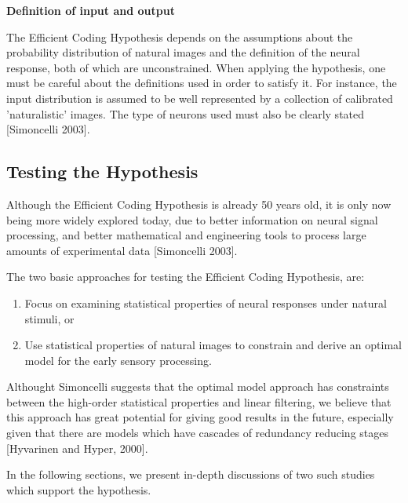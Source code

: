 \documentclass[twoside]{article}
\begin{document}
\begin{multicols}{2}
\noindent\textbf{Definition of input and output}

The Efficient Coding Hypothesis depends on the assumptions about the probability distribution of natural images and the definition of the neural response, both of which are unconstrained. When applying the hypothesis, one must be careful about the definitions used in order to satisfy it. For instance, the input distribution is assumed to be well represented by a collection of calibrated 'naturalistic' images. The type of neurons used must also be clearly stated [Simoncelli 2003].

\subsection{Testing the Hypothesis}

Although the Efficient Coding Hypothesis is already 50 years old, it is only now being more widely explored today, due to better information on neural signal processing, and better mathematical and engineering tools to process large amounts of experimental data [Simoncelli 2003].

The two basic approaches for testing the Efficient Coding Hypothesis, are:
\begin{enumerate}[(1)]
	\item Focus on examining statistical properties of neural responses under natural stimuli, or 
	\item Use statistical properties of natural images to constrain and derive an optimal model for the early sensory processing.
\end{enumerate}

Althought Simoncelli suggests that the optimal model approach has constraints between the high-order statistical properties and linear filtering, we believe that this approach has great potential for giving good results in the future, especially given that there are models which have cascades of redundancy reducing stages [Hyvarinen and Hyper, 2000].  

In the following sections, we present in-depth discussions of two such studies which support the hypothesis. 













\end{multicols}
\end{document}
